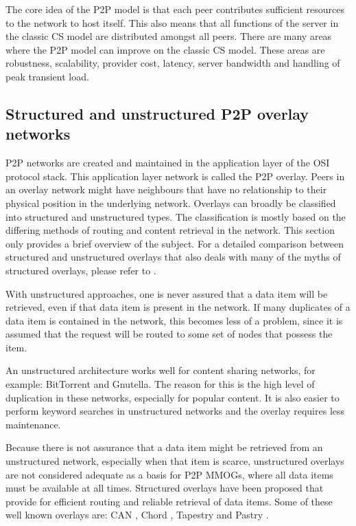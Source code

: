 \documentclass[10pt,a4paper,journal,cspaper,compsoc]{IEEEtran}
\begin{document}
The core idea of the \ac{P2P} model is that each peer contributes sufficient resources to the network to host itself. This also means that all
functions of the server in the classic \ac{CS} model are distributed amongst all peers. There are many areas where the \ac{P2P} model can improve on
the classic \ac{CS} model. These areas are robustness, scalability, provider cost, latency, server bandwidth and handling of peak transient load.

\subsection{Structured and unstructured P2P overlay networks}
\label{overlays}

P2P networks are created and maintained in the application layer of the OSI protocol stack. This application layer network is called the P2P overlay.
Peers in an overlay network might have neighbours that have no relationship to their physical position in the underlying network. Overlays can
broadly be classified into structured and unstructured types. The classification is mostly based on the differing methods of routing and content
retrieval in the network. This section only provides a brief overview of the subject. For a detailed comparison between structured and unstructured
overlays that also deals with many of the myths of structured overlays, please refer to \cite{Castro_structured_overlay_myths}.

With unstructured approaches, one is never assured that a data item will be retrieved, even if that data item is present in the network. If many
duplicates of a data item is contained in the network, this becomes less of a problem, since it is assumed that the request will be routed to some
set of nodes that possess the item.

An unstructured architecture works well for content sharing networks, for example: BitTorrent and Gnutella. The reason for this is the high level of
duplication in these networks, especially for popular content. It is also easier to perform keyword searches in unstructured networks and the overlay
requires less maintenance.

Because there is not assurance that a data item might be retrieved from an unstructured network, especially when that item is scarce, unstructured
overlays are not considered adequate as a basis for P2P MMOGs, where all data items must be available at all times. Structured overlays have been
proposed that provide for efficient routing and reliable retrieval of data items. Some of these well known overlays are: CAN \cite{CAN}, Chord
\cite{chord}, Tapestry \cite{tapestry} and Pastry \cite{pastry}.
\end{document}
